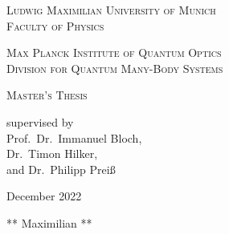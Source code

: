 \begin{titlepage}
    \vspace*{\fill}
    \centering

    \textsc{\Large Ludwig Maximilian University of Munich}\\
    \textsc{Faculty of Physics}

    \vspace{1cm}

    \textsc{\Large Max Planck Institute of Quantum Optics}\\
    \textsc{Division for Quantum Many-Body Systems}

    \vspace{2.5cm}

    \begin{doublespace}
        \makeatletter
        \textsc{ \Huge \@title}
        \makeatother
    \end{doublespace}


    \vspace{2.5cm}
    \huge \textsc{Master's Thesis}



    \vspace{0.3cm}
    \large \textrm{supervised by\\Prof.~Dr.~Immanuel Bloch,\\Dr.~Timon Hilker,\\and Dr.~Philipp Preiß}

    \vspace{1.5cm}
    \huge
    \textrm{December 2022}

    \vspace{1.5cm}
    \Large \textrm{** Maximilian **}

    \vspace*{\fill}
\end{titlepage}







